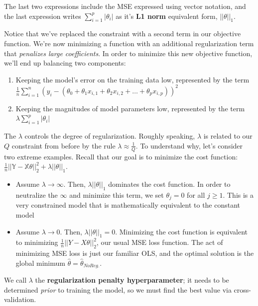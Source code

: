 \documentclass[
  letterpaper,
  DIV=11,
  numbers=noendperiod]{scrreprt}
\providecommand{\tightlist}{%
  \setlength{\itemsep}{0pt}\setlength{\parskip}{0pt}}\usepackage{longtable,booktabs,array}
\begin{document}
The last two expressions include the MSE expressed using vector
notation, and the last expression writes \(\sum_{i=1}^p |\theta_i|\) as
it's \textbf{L1 norm} equivalent form, \(|| \theta ||_1\).

Notice that we've replaced the constraint with a second term in our
objective function. We're now minimizing a function with an additional
regularization term that \emph{penalizes large coefficients}. In order
to minimize this new objective function, we'll end up balancing two
components:

\begin{enumerate}
\def\labelenumi{\arabic{enumi}.}
\tightlist
\item
  Keeping the model's error on the training data low, represented by the
  term
  \(\frac{1}{n} \sum_{i=1}^n (y_i - (\theta_0 + \theta_1 x_{i, 1} + \theta_2 x_{i, 2} + \ldots + \theta_p x_{i, p}))^2\)
\item
  Keeping the magnitudes of model parameters low, represented by the
  term \(\lambda \sum_{i=1}^p |\theta_i|\)
\end{enumerate}

The \(\lambda\) controls the degree of regularization. Roughly speaking,
\(\lambda\) is related to our \(Q\) constraint from before by the rule
\(\lambda \approx \frac{1}{Q}\). To understand why, let's consider two
extreme examples. Recall that our goal is to minimize the cost function:
\(\frac{1}{n}||\mathbb{Y} - \mathbb{X}\theta||_2^2 + \lambda || \theta ||_1\).

\begin{itemize}
\item
  Assume \(\lambda \rightarrow \infty\). Then,
  \(\lambda || \theta ||_1\) dominates the cost function. In order to
  neutralize the \(\infty\) and minimize this term, we set
  \(\theta_j = 0\) for all \(j \ge 1\). This is a very constrained model
  that is mathematically equivalent to the constant model
\item
  Assume \(\lambda \rightarrow 0\). Then, \(\lambda || \theta ||_1=0\).
  Minimizing the cost function is equivalent to minimizing
  \(\frac{1}{n} || Y - X\theta ||_2^2\), our usual MSE loss function.
  The act of minimizing MSE loss is just our familiar OLS, and the
  optimal solution is the global minimum
  \(\hat{\theta} = \hat\theta_{No Reg.}\).
\end{itemize}

We call \(\lambda\) the \textbf{regularization penalty hyperparameter};
it needs to be determined \emph{prior} to training the model, so we must
find the best value via cross-validation.
\end{document}
